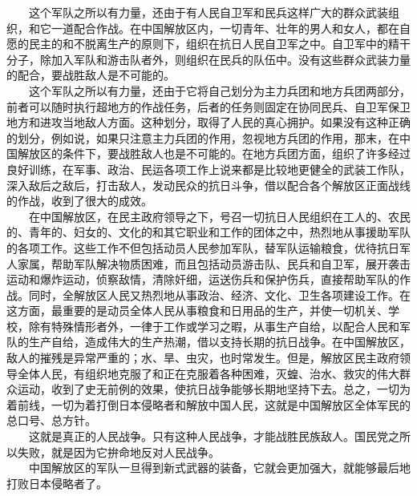 \documentclass[cn,11pt,chinese]{elegantbook}
\begin{document}
　　这个军队之所以有力量，还由于有人民自卫军和民兵这样广大的群众武装组织，和它一道配合作战。在中国解放区内，一切青年、壮年的男人和女人，都在自愿的民主的和不脱离生产的原则下，组织在抗日人民自卫军之中。自卫军中的精干分子，除加入军队和游击队者外，则组织在民兵的队伍中。没有这些群众武装力量的配合，要战胜敌人是不可能的。\\
　　这个军队之所以有力量，还由于它将自己划分为主力兵团和地方兵团两部分，前者可以随时执行超地方的作战任务，后者的任务则固定在协同民兵、自卫军保卫地方和进攻当地敌人方面。这种划分，取得了人民的真心拥护。如果没有这种正确的划分，例如说，如果只注意主力兵团的作用，忽视地方兵团的作用，那末，在中国解放区的条件下，要战胜敌人也是不可能的。在地方兵团方面，组织了许多经过良好训练，在军事、政治、民运各项工作上说来都是比较地更健全的武装工作队，深入敌后之敌后，打击敌人，发动民众的抗日斗争，借以配合各个解放区正面战线的作战，收到了很大的成效。\\
　　在中国解放区，在民主政府领导之下，号召一切抗日人民组织在工人的、农民的、青年的、妇女的、文化的和其它职业和工作的团体之中，热烈地从事援助军队的各项工作。这些工作不但包括动员人民参加军队，替军队运输粮食，优待抗日军人家属，帮助军队解决物质困难，而且包括动员游击队、民兵和自卫军，展开袭击运动和爆炸运动，侦察敌情，清除奸细，运送伤兵和保护伤兵，直接帮助军队的作战。同时，全解放区人民又热烈地从事政治、经济、文化、卫生各项建设工作。在这方面，最重要的是动员全体人民从事粮食和日用品的生产，并使一切机关、学校，除有特殊情形者外，一律于工作或学习之暇，从事生产自给，以配合人民和军队的生产自给，造成伟大的生产热潮，借以支持长期的抗日战争。在中国解放区，敌人的摧残是异常严重的；水、旱、虫灾，也时常发生。但是，解放区民主政府领导全体人民，有组织地克服了和正在克服着各种困难，灭蝗、治水、救灾的伟大群众运动，收到了史无前例的效果，使抗日战争能够长期地坚持下去。总之，一切为着前线，一切为着打倒日本侵略者和解放中国人民，这就是中国解放区全体军民的总口号、总方针。\\
　　这就是真正的人民战争。只有这种人民战争，才能战胜民族敌人。国民党之所以失败，就是因为它拚命地反对人民战争。\\
　　中国解放区的军队一旦得到新式武器的装备，它就会更加强大，就能够最后地打败日本侵略者了。\\
\end{document}
